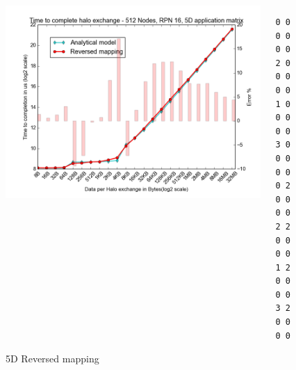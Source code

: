 \documentclass{beamer}
\begin{document}
\begin{frame}
\begin{figure}
\caption{5D Reversed mapping}
\begin{columns}
  \begin{column}{0.6\textwidth}
    \includegraphics[width=1\textwidth]{../mappings/5d_reversed_model.png}
  \end{column}
  \begin{column}{0.3\textwidth}
\lstset{title=Mapping sample}
\begin{lstlisting}[basicstyle=\footnotesize\ttfamily, frame=lines,columns=fixed]
0 0 0 0 0 0
2 0 0 0 0 0
1 0 0 0 0 0
3 0 0 0 0 0
0 2 0 0 0 0
2 2 0 0 0 0
1 2 0 0 0 0
3 2 0 0 0 0
\end{lstlisting}
  \end{column}
\end{columns}
\end{figure}
\end{frame}
\end{document}
